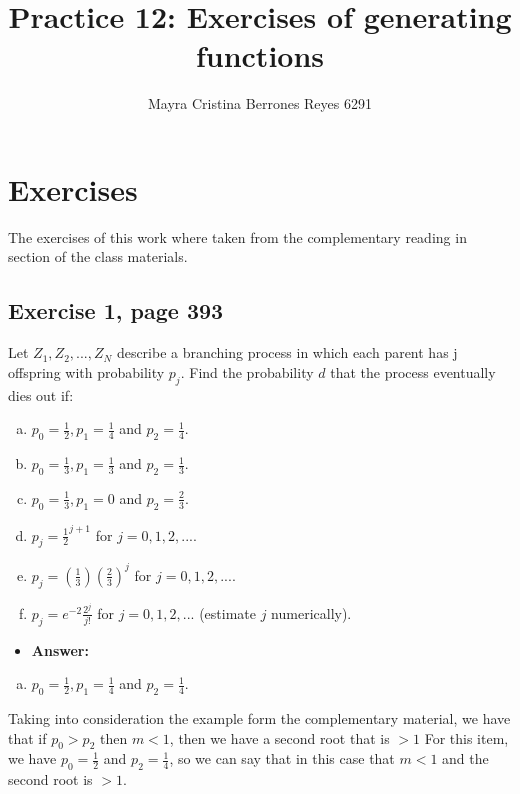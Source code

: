 \documentclass{article}
\begin{document}
\title{%
  Practice 12: Exercises of generating functions} %
\author{Mayra Cristina Berrones Reyes 6291}

\maketitle

\section{Exercises}

The exercises of this work where taken from the complementary reading in section \cite{grin} of the class materials.

\subsection{Exercise 1, page 393}

Let $Z_1, Z_2, ..., Z_N$ describe a branching process in which each parent has j offspring with probability $p_j$. Find the probability $d$ that the process eventually dies out if:

\begin{enumerate}[(a)]
\item $p_0=\frac{1}{2}, p_1 = \frac{1}{4}$ and $p_2 = \frac{1}{4}$.
\item $p_0=\frac{1}{3}, p_1 = \frac{1}{3}$ and $p_2 = \frac{1}{3}$.
\item $p_0=\frac{1}{3}, p_1 = 0$ and $p_2 = \frac{2}{3}$.
\item $p_j = \frac{1}{2}^{j+1}$ for $j = 0, 1, 2, ...$.
\item $p_j = \left(\frac{1}{3}\right)\left(\frac{2}{3}\right)^{j}$ for $j = 0, 1, 2, ...$.
\item $p_j = e^{-2}\frac{2^j}{j!}$ for $j = 0, 1, 2, ...$ (estimate $j$ numerically).
\end{enumerate}

\begin{itemize}
\item \textbf{Answer:}
\end{itemize}

\begin{enumerate}[(a)]
\item $p_0=\frac{1}{2}, p_1 = \frac{1}{4}$ and $p_2 = \frac{1}{4}$. 
\end{enumerate}
Taking into consideration the example form the complementary material, we have that if $p_0 > p_2$ then $m<1$, then we have a second root that is $> 1$ For this item, we have $p_0 = \frac{1}{2}$ and $p_2 = \frac{1}{4}$, so we can say that in this case that $m < 1$ and the second root is $> 1$.
\end{document}
